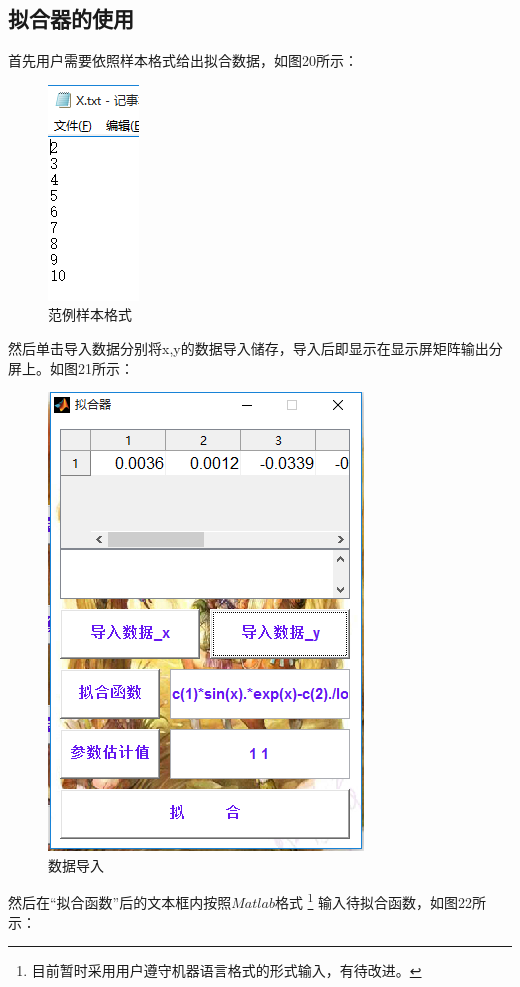 \documentclass[UTF8]{ctexart}
\begin{document}
\subsection{拟合器的使用}
首先用户需要依照样本格式给出拟合数据，如图20所示：
\begin{figure}[H]
\centering
\includegraphics[scale=0.4]{image/pic14.png}
\caption{范例样本格式}
\label{fig:pic14}
\end{figure}
然后单击导入数据分别将x,y的数据导入储存，导入后即显示在显示屏矩阵输出分屏上。如图21所示：
\begin{figure}[H]
\centering
\includegraphics[scale=0.4]{image/pic15.png}
\caption{数据导入}
\label{fig:pic15}
\end{figure}
然后在“拟合函数”后的文本框内按照$Matlab$格式
\footnote{目前暂时采用用户遵守机器语言格式的形式输入，有待改进。}
输入待拟合函数，如图22所示：
\end{document}
